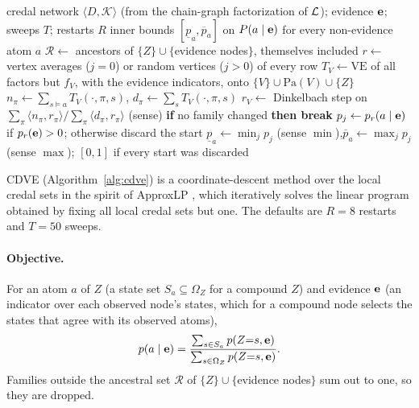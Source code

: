 \documentclass{article} %
\providecommand{\Pa}{\mathrm{Pa}}
\begin{document}
\begin{algorithm}[t!]
\caption{Coordinate Descent with Variable Elimination (CDVE)}
\label{alg:cdve}
\begin{algorithmic}[1]
\Require credal network $\langle D,\mathcal K\rangle$ (from the chain-graph
         factorization of $\mathcal{L}$); evidence $\mathbf{e}$; sweeps $T$; restarts $R$
\Ensure inner bounds $[\underline p_a,\overline p_a]$ on $P(a\mid\mathbf{e})$ for every
        non-evidence atom $a$
  \State $\mathcal R\gets$ ancestors of $\{Z\}\cup\{$evidence nodes$\}$, themselves included
    \State $r\gets$ vertex averages ($j=0$) or random vertices ($j>0$) of every row
        \State $T_V\gets\mathrm{VE}$ of all factors but $f_V$, with the evidence
               indicators, onto $\{V\}\cup\Pa(V)\cup\{Z\}$
        \State $n_\pi\gets\sum_{s\models a}T_V(\cdot,\pi,s)$,\quad
               $d_\pi\gets\sum_sT_V(\cdot,\pi,s)$
        \State $r_V\gets$ Dinkelbach step on
               $\sum_\pi\langle n_\pi,r_\pi\rangle/\sum_\pi\langle d_\pi,r_\pi\rangle$
               (sense)
      \EndFor
      \State \textbf{if} no family changed \textbf{then break}
    \EndFor
    \State $p_j\gets p_r(a\mid\mathbf{e})$ if $p_r(\mathbf{e})>0$; otherwise discard the start
  \EndFor
  \State $\underline p_a\gets\min_jp_j$ (sense $\min$),\quad $\overline p_a\gets\max_jp_j$
         (sense $\max$); $[0,1]$ if every start was discarded
\EndFor
\end{algorithmic}
\end{algorithm}

CDVE (Algorithm~\ref{alg:cdve}) is a coordinate-descent method over the local credal
sets in the spirit of ApproxLP \citep{antonucci2015approxlp}, which iteratively
solves the linear program obtained by fixing all local credal sets but one. The defaults
are $R=8$ restarts and $T=50$ sweeps.

\paragraph{Objective.}
For an atom $a$ of $Z$ (a state set $S_a\subseteq \Omega_Z$ for a compound $Z$) and
evidence $\mathbf{e}$ (an indicator over each observed node's states, which for a
compound node selects the states that agree with its observed atoms),
\[
  p(a\mid\mathbf{e})=\frac{\sum_{s\in S_a}p(Z{=}s,\mathbf{e})}{\sum_{s\in \Omega_Z}p(Z{=}s,\mathbf{e})}.
\]
Families outside the ancestral set $\mathcal R$ of $\{Z\}\cup\{$evidence
nodes$\}$ sum out to one, so they are dropped.
\end{document}
